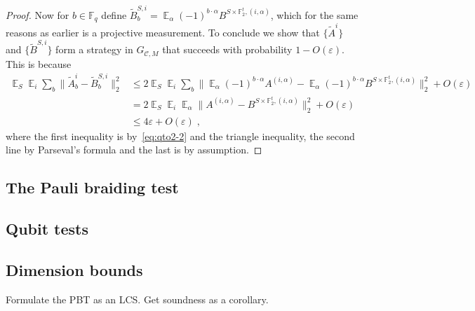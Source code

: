 \documentclass[11pt]{article}
\theoremstyle{definition}
\newcommand{\code}{\mathscr{C}}
\DeclareMathOperator*{\Expectation}{\mathbb{E}}
\newcommand{\Es}[1]{\Expectation_{#1}}
\newcommand{\F}{\ensuremath{\mathbb{F}}}
\newcommand{\eps}{\varepsilon}
\begin{document}
\begin{proof}
Now for $b\in \F_q$ define $\tilde{B}^{S,i}_b= \Es{\alpha} (-1)^{b\cdot \alpha} B^{S\times \F_2^t,(i,\alpha)}$, which for the same reasons as earlier is a projective measurement. 
To conclude we show that $\{\tilde{A}^{i}\}$ and $\{\tilde{B}^{S,i}\}$ form a strategy in $G_{\code, M}$ that succeeds with probability $1-O(\eps)$. This is because
\begin{align*}
\Es{S}\Es{i} \sum_b \big\| \tilde{A}^i_b - \tilde{B}^{S,i}_b \big\|_2^2
&\leq 2\Es{S}\Es{i} \sum_b \Big\| \Es{\alpha} (-1)^{b\cdot \alpha} {A}^{(i,\alpha)} - \Es{\alpha} (-1)^{b\cdot \alpha} B^{S\times \F_2^t,(i,\alpha)}\Big\|_2^2 + O(\eps)\\
&= 2\Es{S}\Es{i} \Es{\alpha}\big\|  {A}^{(i,\alpha)} -  B^{S\times \F_2^t,(i,\alpha)}\big\|_2^2 + O(\eps)\\
&\leq 4\eps + O(\eps)\;,
\end{align*}
where the first inequality is by~\eqref{eq:qto2-2} and the triangle inequality, the second line by Parseval's formula and the last is by assumption. 
\end{proof}

\subsection{The Pauli braiding test}

\subsection{Qubit tests}

\subsection{Dimension bounds}


Formulate the PBT as an LCS. Get soundness as a corollary. 







\notesendofpaper
\end{document}
